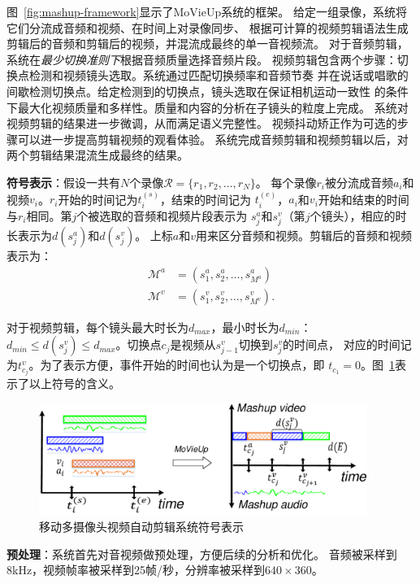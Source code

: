 \documentclass[doctor]{ustcthesis}
\begin{document}
图~\ref{fig:mashup-framework}显示了MoVieUp系统的框架。
给定一组录像，系统将它们分流成音频和视频、在时间上对录像同步、
根据可计算的视频剪辑语法生成剪辑后的音频和剪辑后的视频，并混流成最终的单一音视频流。
对于音频剪辑，系统在\emph{最少切换准则下}根据音频质量选择音频片段。
视频剪辑包含两个步骤：切换点检测和视频镜头选取。系统通过匹配切换频率和音频节奏
并在说话或唱歌的间歇检测切换点。给定检测到的切换点，镜头选取在保证相机运动一致性
的条件下最大化视频质量和多样性。质量和内容的分析在子镜头的粒度上完成。
系统对视频剪辑的结果进一步微调，从而满足语义完整性。
视频抖动矫正作为可选的步骤可以进一步提高剪辑视频的观看体验。
系统完成音频剪辑和视频剪辑以后，对两个剪辑结果混流生成最终的结果。

\textbf{符号表示}：假设一共有$N$个录像$\mathcal{R}=\{r_1, r_2, \ldots, r_N\}$。
每个录像$r_i$被分流成音频$a_i$和视频$v_i$。$r_i$开始的时间记为$t_i^{(s)}$，结束的时间记为
$t_i^{(e)}$，$a_i$和$v_i$开始和结束的时间与$r_i$相同。第$j$个被选取的音频和视频片段表示为
$s_j^a$和$s_j^v$（第$j$个镜头），相应的时长表示为$d(s_j^a)$和$d(s_j^v)$。
上标$a$和$v$用来区分音频和视频。剪辑后的音频和视频表示为：
\begin{eqnarray*}
    \mathcal{M}^a &= (s_1^a, s_2^a,\ldots, s_{M^a}^a) \\
    \mathcal{M}^v &= (s_1^v, s_2^v,\ldots, s_{M^v}^v).
\end{eqnarray*}

对于视频剪辑，每个镜头最大时长为$d_{max}$，最小时长为$d_{min}$：$d_{min} \leq
d(s_j^v) \leq d_{max}$。切换点$c_j$是视频从$s_{j-1}^v$切换到$s_j^v$的时间点，
对应的时间记为$t_{c_j}^v$。为了表示方便，事件开始的时间也认为是一个切换点，即
$t_{c_1} = 0$。图~\ref{fig:mashup-symbols}表示了以上符号的含义。
\begin{figure}[t]
    \centering
    \includegraphics[clip=true, width=0.95\textwidth]{mashup-symbols.pdf}
    \caption{移动多摄像头视频自动剪辑系统符号表示}
    \label{fig:mashup-symbols}
\end{figure}

\textbf{预处理}：系统首先对音视频做预处理，方便后续的分析和优化。
音频被采样到8kHz，视频帧率被采样到25帧/秒，分辨率被采样到$640\times 360$。
\end{document}
